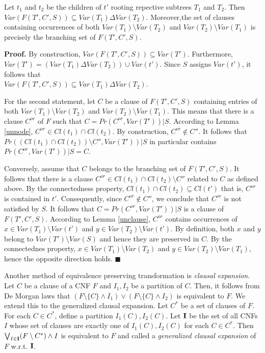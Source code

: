 \documentclass{llncs}
\begin{document}
\begin{lemma} \label{t1t2}
Let $t_1$ and $t_2$ be the children of $t'$ rooting repective subtrees $T_1$ and $T_2$.
Then $Var(F(T',C',S)) \subseteq Var(T_1) \Delta Var(T_2)$. Moreover,the set of clauses
containing occurrences of both $Var(T_1) \setminus Var(T_2)$ and $Var(T_2)\setminus Var(T_1)$
is precisely the branching set of $F(T',C',S)$. 
\end{lemma}

{\bf Proof.}
By construction, $Var(F(T',C',S)) \subseteq Var(T')$. Furthermore, $Var(T')=(Var(T_1) \Delta Var(T_2)) \cup Var(t')$.
Since $S$ assigns $Var(t')$, it follows that\\ $Var(F(T',C',S)) \subseteq Var(T_1) \Delta Var(T_2)$.

For the second statement, let $C$ be a clause of $F(T',C',S)$ containing entries of both
$Var(T_1) \setminus Var(T_2)$ and $Var(T_2) \setminus Var(T_1)$. This means that there is a clause $C^{or}$ of $F$
such that $C=Pr(C^{or},Var(T'))|S$. According to Lemma \ref{unnode}, $C^{or} \in Cl(t_1) \cap Cl(t_2)$.
By construction, $C^{or} \notin C''$. It follows that $Pr((Cl(t_1) \cap Cl(t_2)) \setminus C'',Var(T'))|S$ in particular contains
$Pr(C^{or},Var(T'))|S=C$. 

Conversely, assume that $C$ belongs to the branching set of $F(T',C',S)$.
It follows that there is a clause $C^{or} \in Cl(t_1) \cap Cl(t_2) \setminus C''$ related to $C$ as defined above.
By the connectedness property, $Cl(t_1) \cap Cl(t_2) \subseteq Cl(t')$ that is, $C^{or}$ is contained in $t'$.
Consequently, since $C^{or} \notin C''$, we conclude that $C^{or}$ is not satisfied by $S$.
It follows that $C=Pr(C^{or},Var(T'))|S$ is a clause of $F(T',C',S)$.
According to Lemma \ref{unclause}, $C^{or}$ contains occurrences of $x \in Var(T_1) \setminus Var(t')$ and
$y \in Var(T_2) \setminus Var(t')$. By definition, both $x$ and $y$ belong to $Var(T') \setminus Var(S)$ and
hence they are preserved in $C$. By the connectednes property, $x \in Var(T_1) \setminus Var(T_2)$ and
$y \in Var(T_2) \setminus Var(T_1)$, hence the opposite direction holds. $\blacksquare$   

Another method of equivalence preserving transformation is \emph{clausal expansion}. Let $C$ be a clause
of a CNF $F$ and $I_1,I_2$ be a partition of $C$. Then, it follows from De Morgan laws that
$(F \setminus \{C\} \wedge I_1) \vee (F \setminus \{C\} \wedge I_2)$ is equivalent to $F$.
We extend this to the generalized clausal expansion. Let $C^*$ be a set of clauses of $F$.
For each $C \in C^*$, define a partition $I_1(C),I_2(C)$. Let ${\bf I}$ be the set of all CNFs
$I$ whose set of clauses are exactly one of $I_1(C),I_2(C)$ for each $C \in C^*$.
Then $\bigvee_{I \in {\bf I}} (F \setminus C^*) \wedge I$ is equivalent to $F$ and called a
\emph{generalized clausal expansion} of $F$ w.r.t. ${\bf I}$. 
\end{document}
